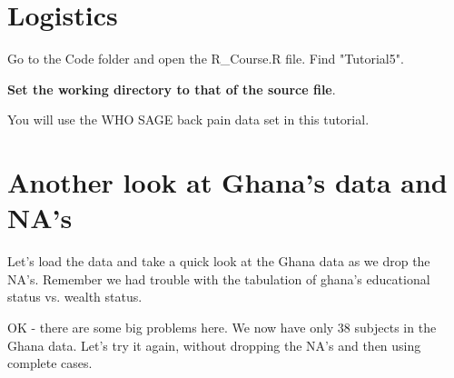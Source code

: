 \documentclass[titlepage]{book}\usepackage{knitr}
\begin{document}
\author{Brian Williams $<$\href{mailto:bjw649@gmail.com}%
{bjw649@gmail.com}$>$}


\section{Logistics}

Go to the Code folder and open the R\_Course.R file.  Find "Tutorial5".

\textbf{Set the working directory to that of the source file}.


You will use the WHO SAGE back pain data set in this tutorial.

\section{Another look at Ghana's data and NA's}

Let's load the data and take a quick look at the Ghana data as we drop the NA's. Remember we had trouble with the tabulation of ghana's educational status vs. wealth status.

\begin{knitrout}
\color{fgcolor}
\end{knitrout}


OK - there are some big problems here.  We now have only 38 subjects in the Ghana data.  Let's try it again, without dropping the NA's and then using complete cases.



\begin{knitrout}
\color{fgcolor}
\end{knitrout}
\end{document}
